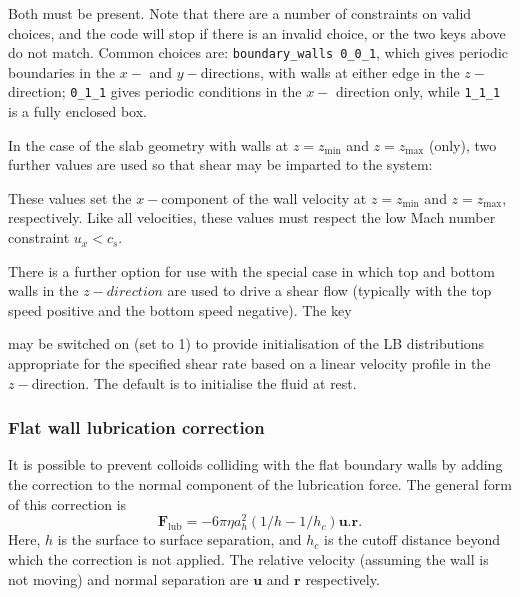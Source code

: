 
Both must be present. Note that there are a number of constraints on
valid choices, and the code will stop if there is an invalid choice, or
the two keys above do not match. Common choices are:
\texttt{boundary\_walls 0\_0\_1},
which gives periodic boundaries in the $x-$ and $y-$directions, with
walls at either edge in the $z-$direction; \texttt{0\_1\_1}
gives periodic conditions in the $x-$ direction only, while
\texttt{1\_1\_1} is a fully enclosed box.

In the case of the slab geometry with walls at $z = z_{\min}$ and
$z= z_{\max}$ (only),
two further values are used so that shear may be imparted to the system:



These values set the $x-$component of the wall velocity at
$z = z_{\min}$ and $z = z_{\max}$, respectively. Like all
velocities, these values must respect the low Mach number
constraint $u_x < c_s$.

There is a further option for use with the special case in which
top and bottom walls in the $z-direction$ are used to drive a shear
flow (typically with the top speed positive and the bottom speed
negative). The key


may be switched on (set to 1) to provide initialisation of the
LB distributions appropriate for the specified shear rate based
on a linear velocity profile in the $z-$direction. The default
is to initialise the fluid at rest.

\subsubsection{Flat wall lubrication correction}

It is possible to prevent colloids colliding with the flat boundary walls
by adding the correction to the normal component of the lubrication
force. The general form of this correction is
\begin{equation}
\mathbf{F}_{\mathrm{lub}} = -6\pi \eta a_h^2
(1/h - 1/h_c)
\mathbf{u} . \mathbf{r}.
\end{equation}
Here, $h$ is the surface to surface separation, and $h_c$ is the cutoff
distance beyond which the correction is not applied. The relative
velocity (assuming the wall is not moving) and normal separation are
$\mathbf{u}$ and $\mathbf{r}$ respectively.

